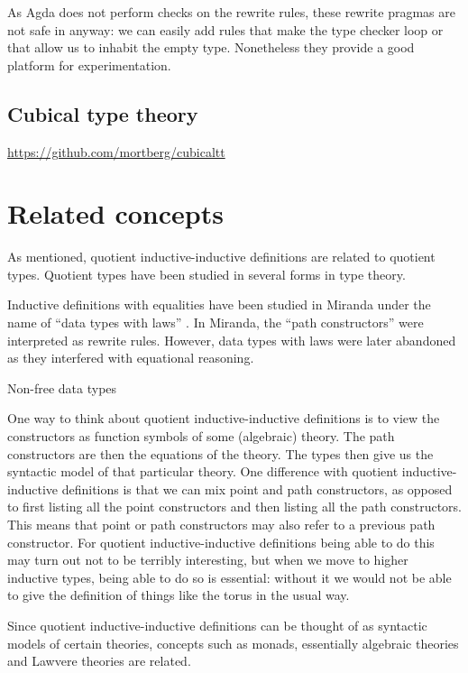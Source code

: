 As Agda does not perform checks on the rewrite rules, these rewrite
pragmas are not safe in anyway: we can easily add rules that make the
type checker loop or that allow us to inhabit the empty
type. Nonetheless they provide a good platform for experimentation.

\subsection{Cubical type theory}

\url{https://github.com/mortberg/cubicaltt}

\cite{Cohen2015}

\section{Related concepts}

As mentioned, quotient inductive-inductive definitions are related to
quotient types. Quotient types have been studied in several forms in
type theory.

Inductive definitions with equalities have been studied in Miranda
\cite{Turner1985} under the name of ``data types with laws''
\cite{Thompson1986} \cite{Thompson1990}. In Miranda, the ``path
constructors'' were interpreted as rewrite rules. However, data types
with laws were later abandoned as they interfered with equational
reasoning.

Non-free data types \cite{Blanqui2007}

One way to think about quotient inductive-inductive definitions is to
view the constructors as function symbols of some (algebraic)
theory. The path constructors are then the equations of the
theory. The types then give us the syntactic model of that particular
theory. One difference with quotient inductive-inductive definitions
is that we can mix point and path constructors, as opposed to first
listing all the point constructors and then listing all the path
constructors. This means that point or path constructors may also
refer to a previous path constructor. For quotient inductive-inductive
definitions being able to do this may turn out not to be terribly
interesting, but when we move to higher inductive types, being able to
do so is essential: without it we would not be able to give the
definition of things like the torus in the usual way.

Since quotient inductive-inductive definitions can be thought of as
syntactic models of certain theories, concepts such as monads,
essentially algebraic theories and Lawvere theories are related.